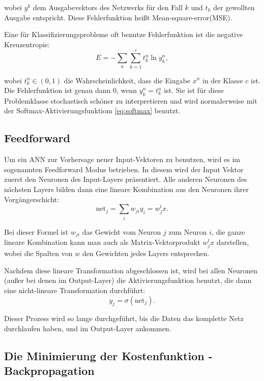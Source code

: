 wobei $y^k$ dem Ausgabevektors des Netzwerks für den Fall $k$ und $t_k$ der gewollten Ausgabe entspricht.
Diese Fehlerfunktion heißt  Mean-square-error(MSE)\cite{bishop1995neural}.

Eine für Klassifizierungsprobleme oft benutze Fehlerfunktion ist die negative Kreuzentropie:
\begin{equation}
\label{eq:crossEntropy}
    E = -\sum_{n} \sum_{k=1}^c t_k^n \ln y_k^n ,
\end{equation}

wobei $t_k^n \in (0,1)$ die Wahrscheinlichkeit, dass die Eingabe $x^n$ in der Klasse $c$ ist. Die Fehlerfunktion ist genau dann $0$, wenn $y_k^n = t_k^n$ ist. 
Sie ist für diese Problemklasse stochastisch schöner zu interpretieren und wird normalerweise mit der Softmax-Aktivierungsfunktiom \ref{eq:softmax} benutzt\cite{bishop1995neural}.

\subsection{Feedforward}
Um ein ANN zur Vorhersage neuer Input-Vektoren zu benutzen, wird es im sogenannten Feedforward Modus betrieben. In diesem wird der Input Vektor zuerst den Neuronen des Input-Layers präsentiert. Alle anderen Neuronen des nächsten Layers bilden dann eine lineare Kombination aus den Neuronen ihrer Vorgängerschicht: 
\begin{equation}
\label{eq:feedforward1}
\text{net}_j = \sum_{i} w_{ji} y_i = w_j^t x.
\end{equation}

Bei dieser Formel ist $w_{ji}$ das Gewicht vom Neuron $j$ zum Neuron $i$, die ganze lineare Kombination kann man auch als Matrix-Vektorprodukt $w_j^t x$ darstellen, wobei die Spalten von $w$ den Gewichten jedes Layers entsprechen. %

Nachdem diese lineare Transformation abgeschlossen ist, wird bei allen Neuronen (außer bei denen im Output-Layer) die Aktivierungsfunktion benutzt, die dann eine nicht-lineare Transformation durchführt: 
\begin{equation}
\label{eq:feedforward2}
y_j = \sigma (\text{net}_j).
\end{equation}

Dieser Prozess wird so lange durchgeführt, bis die Daten das komplette Netz durchlaufen haben, und im Output-Layer ankommen\cite{bishop1995neural}.


\subsection{Die Minimierung der Kostenfunktion - Backpropagation}

